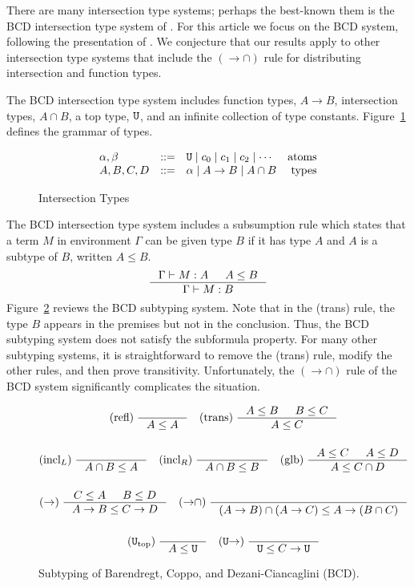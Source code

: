 \documentclass{article}
\begin{document}
There are many intersection type systems; perhaps the best-known them
is the BCD intersection type system of \citet{Barendregt:1983aa}. For
this article we focus on the BCD system, following the presentation of
\citet{Barendregt:2013aa}. We conjecture that our results apply to
other intersection type systems that include the $({\to}{\cap})$ rule
for distributing intersection and function types.

The BCD intersection type system includes function types, $A \to B$,
intersection types, $A \cap B$, a top type, $\mathtt{U}$, and an infinite
collection of type constants. Figure~\ref{fig:types} defines the
grammar of types.

\begin{figure}[tbp]
  \[
  \begin{array}{lclr}
    \alpha,\beta & ::= & \mathtt{U} \mid c_0 \mid c_1 \mid c_2 \mid \cdots & \text{atoms}\\
    A,B,C,D & ::= & \alpha \mid A \to B \mid A \cap B & \text{types}
  \end{array}
  \]
  \caption{Intersection Types}
  \label{fig:types}
\end{figure}

The BCD intersection type system includes a subsumption rule which
states that a term $M$ in environment $\Gamma$ can be given type $B$
if it has type $A$ and $A$ is a subtype of $B$, written $A \leq B$.
\[
\inference{\Gamma \vdash M : A & A \leq B}
          {\Gamma \vdash M : B}
\]
Figure~\ref{fig:BCD-subtyping} reviews the BCD subtyping system.  Note
that in the (trans) rule, the type $B$ appears in the premises but not
in the conclusion. Thus, the BCD subtyping system does not satisfy the
subformula property.  For many other subtyping systems, it is
straightforward to remove the (trans) rule, modify the other rules,
and then prove transitivity.  Unfortunately, the $({\to}{\cap})$ rule
of the BCD system significantly complicates the situation.

\begin{figure}[tbp]
  \begin{gather*}
    \text{(refl)} \; \inference{}{A \leq A} \quad
    \text{(trans)} \; \inference{A \leq B & B \leq C}{A \leq C} \\[3ex]
    \text{(incl$_L$)} \; \inference{}{A \cap B \leq A} \quad
    \text{(incl$_R$)} \; \inference{}{A \cap B \leq B} \quad
    \text{(glb)} \; \inference{A \leq C & A \leq D}{A \leq C \cap D} \\[3ex]
    (\to) \; \inference{C \leq A & B \leq D}{A \to B \leq C \to D} \quad
    ({\to}{\cap}) \; \inference{}{(A \to B) \cap (A \to C) \leq A \to (B \cap C)} \\[3ex]
    (\TOP_{\mathrm{top}}) \; \inference{}{A \leq \TOP} \quad
    (\TOP{\to}) \; \inference{}{\TOP \leq C \to \TOP}
  \end{gather*}
  \caption{Subtyping of Barendregt, Coppo, and
    Dezani-Ciancaglini (BCD).}
  \label{fig:BCD-subtyping}
\end{figure}
\end{document}
